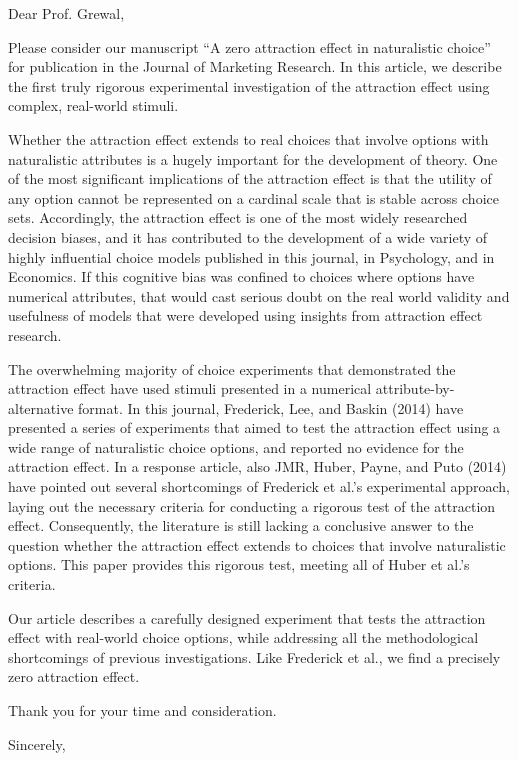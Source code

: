 \documentclass{letter}
\begin{document}
\begin{letter}
{}
\opening{Dear Prof. Grewal,} %

Please consider our manuscript ``A zero attraction effect in naturalistic choice'' for publication in the Journal of Marketing Research. In this article, we describe the first truly rigorous experimental investigation of the attraction effect using complex, real-world stimuli.

Whether the attraction effect extends to real choices that involve options with naturalistic attributes is a hugely important for the development of theory. One of the most significant implications of the attraction effect is that the utility of any option cannot be represented on a cardinal scale that is stable across choice sets. Accordingly, the attraction effect is one of the most widely researched decision biases, and it has contributed to the development of a wide variety of highly influential choice models published in this journal, in Psychology, and in Economics. If this cognitive bias was confined to choices where options have numerical attributes, that would cast serious doubt on the real world validity and usefulness of models that were developed using insights from attraction effect research.

The overwhelming majority of choice experiments that demonstrated the attraction effect have used stimuli presented in a numerical attribute-by-alternative format. In this journal, Frederick, Lee, and Baskin (2014) have presented a series of experiments that aimed to test the attraction effect using a wide range of naturalistic choice options, and reported no evidence for the attraction effect. In a response article, also JMR, Huber, Payne, and Puto (2014) have pointed out several shortcomings of Frederick et al.'s experimental approach, laying out the necessary criteria for conducting a rigorous test of the attraction effect. Consequently, the literature is still lacking a conclusive answer to the question whether the attraction effect extends to choices that involve naturalistic options. This paper provides this rigorous test, meeting all of Huber et al.'s criteria.

Our article describes a carefully designed experiment that tests the attraction effect with real-world choice options, while addressing all the methodological shortcomings of previous investigations. Like Frederick et al., we find a precisely zero attraction effect.

Thank you for your time and consideration.

\closing{Sincerely,}



\end{letter}
\end{document}
